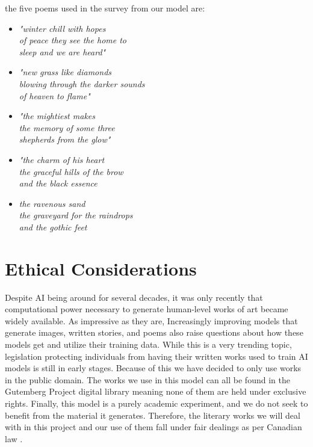 \documentclass{article} %
\begin{document}
the five poems used in the survey from our model are:

\begin{itemize}


  \item \textit{"winter chill with hopes \\
  of peace they see the home to \\
  sleep and we are heard"}

  \item \textit{"new grass like diamonds \\
  blowing through the darker sounds \\
  of heaven to flame"}

  \item \textit{"the mightiest makes \\
  the memory of some three \\
  shepherds from the glow"}

  \item \textit{"the charm of his heart \\
  the graceful hills of the brow \\
  and the black essence}

  \item \textit{the ravenous sand \\
  the graveyard for the raindrops \\
  and the gothic feet}

\end{itemize}

\section{Ethical Considerations}

Despite AI being around for several decades, it was only recently that computational power necessary to generate human-level works of art became widely available.
As impressive as they are, Increasingly improving models that generate images, written stories, and poems also raise questions about how these models get and utilize their training data.
While this is a very trending topic, legislation protecting individuals from having their written works used to train AI models is still in early stages.
Because of this we have decided to only use works in the public domain.
The works we use in this model can all be found in the Gutemberg Project digital library meaning none of them are held under exclusive rights.
Finally, this model is a purely academic experiment, and we do not seek to benefit from the material it generates.
Therefore, the literary works we will deal with in this project and our use of them fall under fair dealings as per Canadian law \citep{LegislativeServicesBranch_2024} .
\end{document}
